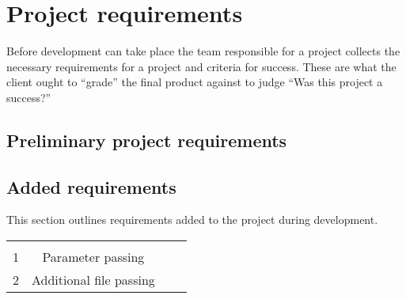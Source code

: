 \section{Project requirements}

Before development can take place the team responsible for a project collects the necessary requirements for a project and criteria for success.
These are what the client ought to ``grade'' the final product against to judge ``Was this project a success?''

\subsection{Preliminary project requirements}









\subsection{Added requirements}

This section outlines requirements added to the project during development.

\begin{center}
  \begin{tabular}{ c| c | c | c }
    \hline \\
    1 & Parameter passing & & \\
    2 & Additional file passing & & \\
  \end{tabular}
\end{center}

